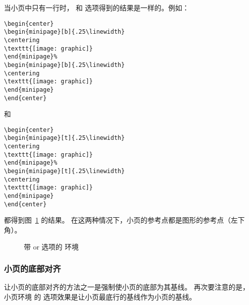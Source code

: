 当小页中只有一行时， \opt{[b]} 和 \opt{[t]} 选项得到的结果是一样的。例如：
\begin{lstlisting}
\begin{center}
\begin{minipage}[b]{.25\linewidth}
\centering
\texttt{[image: graphic]}
\end{minipage}%
\begin{minipage}[b]{.25\linewidth}
\centering
\texttt{[image: graphic]}
\end{minipage}
\end{center}
\end{lstlisting}
和
\begin{lstlisting}
\begin{center}
\begin{minipage}[t]{.25\linewidth}
\centering
\texttt{[image: graphic]}
\end{minipage}%
\begin{minipage}[t]{.25\linewidth}
\centering
\texttt{[image: graphic]}
\end{minipage}
\end{center}
\end{lstlisting}
都得到图~\ref{fig:minipagesamp-1} 的结果。
在这两种情况下，小页的参考点都是图形的参考点（左下角）。
\begin{figure}
\begin{center}
	\begin{minipage}[t]{.25\linewidth}
		\centering
		\resizebox{1in}{!}{\usebox{\boxgraphic}}
	\end{minipage}%
	\begin{minipage}[t]{.25\linewidth}
		\centering
	\end{minipage}
\end{center}
\caption{带 \opt{[b]} or \opt{[t]} 选项的  环境}
\label{fig:minipagesamp-1}
\end{figure}

\subsubsection{小页的底部对齐}
让小页的底部对齐的方法之一是强制使小页的底部为其基线。
再次要注意的是，小页环境  的 \opt{[b]} 选项效果是让小页最底行的基线作为小页的基线。

